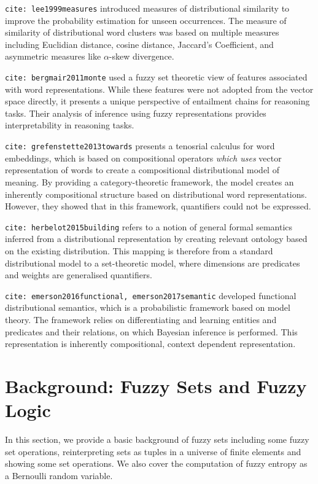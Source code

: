 \documentclass[11pt]{book}
\newcommand{\citet}[1]{\texttt{cite: #1}}
\begin{document}
\citet{lee1999measures} introduced measures of distributional similarity to
improve the probability estimation for unseen occurrences. The measure of
similarity of distributional word clusters was based on multiple measures
including Euclidian distance, cosine distance, Jaccard's Coefficient, and
asymmetric measures like $\alpha$-skew divergence.

\citet{bergmair2011monte} used a fuzzy set theoretic view of features
associated with word representations. While these features were not adopted
from the vector space directly, it presents a unique perspective of entailment
chains for reasoning tasks. Their analysis of inference using fuzzy
representations provides interpretability in reasoning tasks.

\citet{grefenstette2013towards} presents a tenosrial calculus for word
embeddings, which is based on compositional operators \emph{which uses} vector
representation of words to create a compositional distributional model of
meaning. By providing a category-theoretic framework, the model creates an
inherently compositional structure based on distributional word
representations. However, they showed that in this framework, quantifiers could
not be expressed.

\citet{herbelot2015building} refers to a notion of general formal semantics
inferred from a distributional representation by creating relevant ontology
based on the existing distribution. This mapping is therefore from a standard
distributional model to a set-theoretic model, where dimensions are predicates
and weights are generalised quantifiers. 

\citet{emerson2016functional, emerson2017semantic} developed functional
distributional semantics, which is a probabilistic framework based on model
theory. The framework relies on differentiating and learning entities and
predicates and their relations, on which Bayesian inference is performed. This
representation is inherently compositional, context dependent representation. 

\section{Background: Fuzzy Sets and Fuzzy Logic} \label{sec: math}

In this section, we provide a basic background of fuzzy sets including some
fuzzy set operations, reinterpreting sets as tuples in a universe of finite
elements and showing some set operations. We also cover the computation of
fuzzy entropy as a Bernoulli random variable. 
\end{document}
